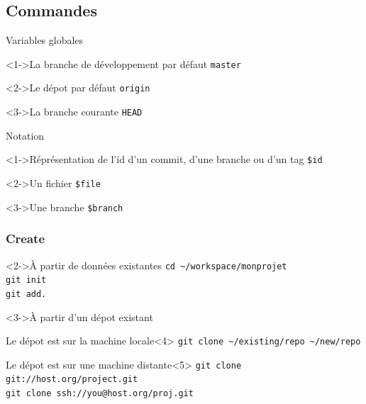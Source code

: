 \subsection{Commandes}


	\begin{frame}[fragile]{Variables globales}
		\begin{block}<1->{La branche de développement par défaut}
			\verb'master'
		\end{block}
		\begin{block}<2->{Le dépot par défaut}
			\verb'origin'
		\end{block}
		\begin{block}<3->{La branche courante}
			\verb'HEAD'
		\end{block}
	\end{frame}
	

	
	\begin{frame}[fragile]{Notation}
		\begin{block}<1->{Réprésentation de l'id d'un commit, d'une branche ou d'un tag}
			\verb'$id'
		\end{block}
		\begin{block}<2->{Un fichier}
			\verb'$file'
		\end{block}
		\begin{block}<3->{Une branche}
			\verb'$branch'
		\end{block}
	\end{frame}

		\begin{frame}[fragile]
			\frametitle{Create}
			\begin{block}<2->{À partir de données existantes}
				\verb'cd ~/workspace/monprojet'\\
				\verb'git init'\\
				\verb'git add.'
			\end{block}
			\begin{block}<3->{À partir d'un dépot existant}
				\begin{exampleblock}{Le dépot est sur la machine locale}<4>
					\verb'git clone ~/existing/repo ~/new/repo'\\
				\end{exampleblock}

				\begin{exampleblock}{Le dépot est sur une machine distante}<5>
					\verb'git clone git://host.org/project.git'\\
					\verb'git clone ssh://you@host.org/proj.git'
				\end{exampleblock}
			\end{block}

		\end{frame}
		

